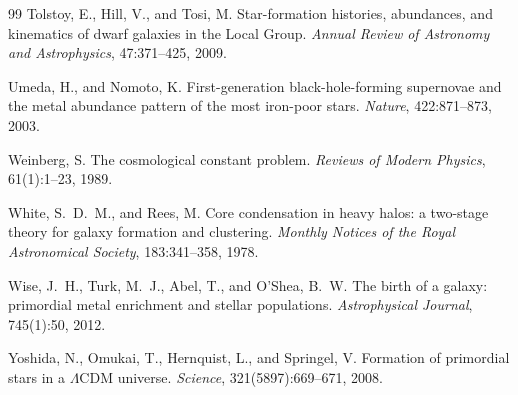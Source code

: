 \documentclass[12pt, a4paper]{article}
\theoremstyle{definition}
\begin{document}
\begin{thebibliography}{99}
Tolstoy, E., Hill, V., and Tosi, M.
\newblock Star-formation histories, abundances, and kinematics of dwarf galaxies
  in the Local Group.
\newblock \textit{Annual Review of Astronomy and Astrophysics}, 47:371--425, 2009.

Umeda, H., and Nomoto, K.
\newblock First-generation black-hole-forming supernovae and the metal abundance pattern
  of the most iron-poor stars.
\newblock \textit{Nature}, 422:871--873, 2003.

Weinberg, S.
\newblock The cosmological constant problem.
\newblock \textit{Reviews of Modern Physics}, 61(1):1--23, 1989.

White, S.~D.~M., and Rees, M.
\newblock Core condensation in heavy halos: a two-stage theory for galaxy formation
  and clustering.
\newblock \textit{Monthly Notices of the Royal Astronomical Society}, 183:341--358, 1978.

Wise, J.~H., Turk, M.~J., Abel, T., and O'Shea, B.~W.
\newblock The birth of a galaxy: primordial metal enrichment and stellar populations.
\newblock \textit{Astrophysical Journal}, 745(1):50, 2012.

Yoshida, N., Omukai, T., Hernquist, L., and Springel, V.
\newblock Formation of primordial stars in a $\Lambda$CDM universe.
\newblock \textit{Science}, 321(5897):669--671, 2008.

\end{thebibliography}
\end{document}
